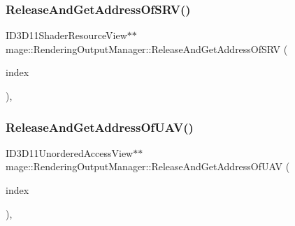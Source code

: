 \hypertarget{classmage_1_1_rendering_output_manager_ab6b8045718c2dbfc8b64c23d220a2288}{}\label{classmage_1_1_rendering_output_manager_ab6b8045718c2dbfc8b64c23d220a2288} 
\subsubsection{\texorpdfstring{Release\+And\+Get\+Address\+Of\+S\+R\+V()}{ReleaseAndGetAddressOfSRV()}}
{\footnotesize\ttfamily I\+D3\+D11\+Shader\+Resource\+View$\ast$$\ast$ mage\+::\+Rendering\+Output\+Manager\+::\+Release\+And\+Get\+Address\+Of\+S\+RV (\begin{DoxyParamCaption}\item[{\hyperlink{classmage_1_1_rendering_output_manager_ab23ee4985ed0d176479fe796dc3a4cfd}{S\+R\+V\+Index}}]{index }\end{DoxyParamCaption})\hspace{0.3cm}{\ttfamily [private]}, {\ttfamily [noexcept]}}

\hypertarget{classmage_1_1_rendering_output_manager_acd5d6a8feb5a7d9aa41667be0cef617b}{}\label{classmage_1_1_rendering_output_manager_acd5d6a8feb5a7d9aa41667be0cef617b} 
\subsubsection{\texorpdfstring{Release\+And\+Get\+Address\+Of\+U\+A\+V()}{ReleaseAndGetAddressOfUAV()}}
{\footnotesize\ttfamily I\+D3\+D11\+Unordered\+Access\+View$\ast$$\ast$ mage\+::\+Rendering\+Output\+Manager\+::\+Release\+And\+Get\+Address\+Of\+U\+AV (\begin{DoxyParamCaption}\item[{\hyperlink{classmage_1_1_rendering_output_manager_a222cae54b40bbb153da0dfa840a37fdb}{U\+A\+V\+Index}}]{index }\end{DoxyParamCaption})\hspace{0.3cm}{\ttfamily [private]}, {\ttfamily [noexcept]}}

